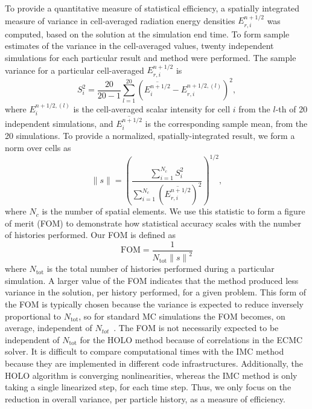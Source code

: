 \documentclass{anstrans}
\newcommand{\FOM}{\ensuremath{\text{FOM}}}
\newcommand{\ds}[0]{\displaystyle}
\renewcommand{\ss}{\ensuremath{\|s\|}}
\begin{document}
To provide a quantitative measure of statistical efficiency, a spatially integrated 
measure of variance in cell-averaged radiation energy
densities $E_{r,i}^{n+1/2}$ was computed, based on the solution at the simulation end time.
To form sample estimates of the variance in the cell-averaged values, twenty independent simulations for each
particular result and method were performed.%
The sample variance for a particular cell-averaged $E_{r,i}^{n+1/2}$ is 
\begin{equation} 
    S_i^2 =  \frac{20}{20-1} \sum_{l=1}^{20} \left(\overline{E^{n+1/2}_{i}} -
    E_{r,i}^{n+1/2,(l)}\right)^2,
\end{equation}
where $E_{i}^{n+1/2,(l)}$ is the cell-averaged scalar intensity for cell $i$ from the $l$-th of 20 independent simulations, and
$\overline{E^{n+1/2}_{i}}$ is the corresponding sample mean, from the 20 simulations. To
provide a normalized, spatially-integrated result, we form a norm over cells as 
\begin{equation}
    \ss = \left({\frac{\ds \sum\limits_{i=1}^{N_c}
S_i^2}{\ds \sum\limits_{i=1}^{N_c}\left(\overline{E_{r,i}^{n+1/2}}\right)^2}}\right)^{1/2},
\end{equation}
where $N_c$ is the number of spatial elements. We use this statistic to form a figure of merit (FOM) to demonstrate how statistical accuracy
scales with the number of histories performed.  Our FOM is defined as
\begin{equation}\label{eq:fom}
    \FOM = \frac{1}{N_{\text{tot}}\ss^2}
\end{equation}
where $N_{\text{tot}}$ is the total number of histories performed during a particular simulation.
A larger value of the FOM indicates that the method produced less variance in the
solution, per history performed, for a given problem.  This form of the FOM
is typically chosen because the variance is expected to reduce inversely proportional
to $N_{\text{tot}}$, so for standard MC simulations the FOM becomes, on average, independent of
$N_{tot}$~\cite{shultis_mc}.  The FOM is not necessarily expected to be independent
of $N_{\text{tot}}$ for the HOLO method because of correlations in the ECMC solver.
It is difficult to compare computational times with the IMC method because they are implemented in
different code infrastructures.  Additionally, the HOLO algorithm is converging nonlinearities,
whereas the IMC method is only taking a single linearized step, for each time step.  Thus, we only
focus on the reduction in overall variance, per particle history, as a measure of efficiency.
\end{document}
